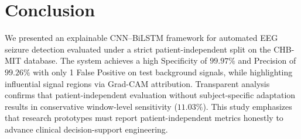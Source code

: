 \documentclass[conference]{IEEEtran}
\begin{document}
\section{Conclusion}
We presented an explainable CNN--BiLSTM framework for automated EEG seizure detection evaluated under a strict patient-independent split on the CHB-MIT database. The system achieves a high Specificity of $99.97\%$ and Precision of $99.26\%$ with only 1 False Positive on test background signals, while highlighting influential signal regions via Grad-CAM attribution. Transparent analysis confirms that patient-independent evaluation without subject-specific adaptation results in conservative window-level sensitivity ($11.03\%$). This study emphasizes that research prototypes must report patient-independent metrics honestly to advance clinical decision-support engineering.
\end{document}
